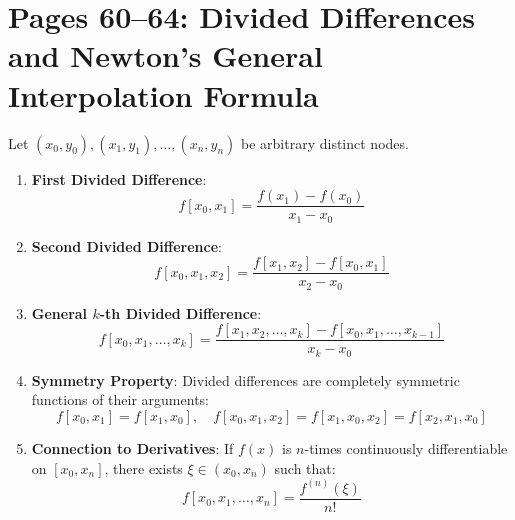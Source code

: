 \section{Pages 60--64: Divided Differences and Newton's General Interpolation Formula}
\label{sec:divided_differences}

\begin{theorembox}
Let $(x_0, y_0), (x_1, y_1), \dots, (x_n, y_n)$ be arbitrary distinct nodes.
\begin{enumerate}
    \item \textbf{First Divided Difference}:
    \begin{equation}
        \boxed{f[x_0, x_1] = \frac{f(x_1) - f(x_0)}{x_1 - x_0}}
    \end{equation}
    \item \textbf{Second Divided Difference}:
    \begin{equation}
        \boxed{f[x_0, x_1, x_2] = \frac{f[x_1, x_2] - f[x_0, x_1]}{x_2 - x_0}}
    \end{equation}
    \item \textbf{General $k$-th Divided Difference}:
    \begin{equation}
        \boxed{f[x_0, x_1, \dots, x_k] = \frac{f[x_1, x_2, \dots, x_k] - f[x_0, x_1, \dots, x_{k-1}]}{x_k - x_0}}
    \end{equation}
    \item \textbf{Symmetry Property}:
    Divided differences are completely symmetric functions of their arguments:
    \begin{equation}
        f[x_0, x_1] = f[x_1, x_0], \quad f[x_0, x_1, x_2] = f[x_1, x_0, x_2] = f[x_2, x_1, x_0]
    \end{equation}
    \item \textbf{Connection to Derivatives}:
    If $f(x)$ is $n$-times continuously differentiable on $[x_0, x_n]$, there exists $\xi \in (x_0, x_n)$ such that:
    \begin{equation}
        \boxed{f[x_0, x_1, \dots, x_n] = \frac{f^{(n)}(\xi)}{n!}}
    \end{equation}
\end{enumerate}
\end{theorembox}

